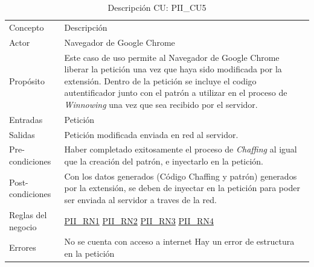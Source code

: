 \documentclass[12pt, a4paper, titlepage]{report}
\begin{document}
				\begin{table}[H]
    				\begin{tabular}{ |p{3.5cm}||p{9.5cm}|}
    					\hline
    					\rowcolor{guindapoli}
    					\multicolumn{2}{|c|}{\textbf{\textcolor{white}{Caso de uso: PII\_CU5. Liberación de Petición.}}}\\
    					\hline
    					\rowcolor{azulfuerte}Concepto & Descripción\\
    					\hline
    					\cellcolor{azulclaro}Actor & 
    					Navegador de Google Chrome\\ 
    					\hline
    					\cellcolor{azulclaro}Propósito &
    					Este caso de uso permite al Navegador de Google Chrome liberar la petición una vez que haya sido modificada por la extensión. Dentro de la petición se incluye el codigo autentificador junto con el patrón a utilizar en el proceso de \textit{Winnowing} una vez que sea recibido por el servidor.\\
    					\hline
    					\cellcolor{azulclaro}Entradas &
    					Petición\\
    					\hline
    					\cellcolor{azulclaro}Salidas &
    					Petición modificada enviada en red al servidor.\\
    					\hline
    					\cellcolor{azulclaro}Pre-condiciones&
    					Haber completado exitosamente el proceso de \textit{Chaffing} al igual que la creación del patrón, e inyectarlo en la petición.\\
    					\hline
    					\cellcolor{azulclaro}Post-condiciones&
    					Con los datos generados (Código Chaffing y patrón) generados por la extensión, se deben de inyectar en la petición para poder ser enviada al servidor a traves de la red.\\
    					\hline
    					\cellcolor{azulclaro}Reglas del negocio&
    					\hyperref[PII_RN1]{PII\_RN1} \newline \hyperref[PII_RN2]{PII\_RN2} \newline
    					\hyperref[PII_RN3]{PII\_RN3} \newline
    					\hyperref[PII_RN4]{PII\_RN4} \\
    					\hline
    					\cellcolor{azulclaro}Errores &
    					No se cuenta con acceso a internet \newline
    					Hay un error de estructura en la petición \\		
    					\hline
    				\end{tabular}
				\caption[DCU: PII\_CU5]{Descripción CU: PII\_CU5}
				\end{table}
				
\end{document}

